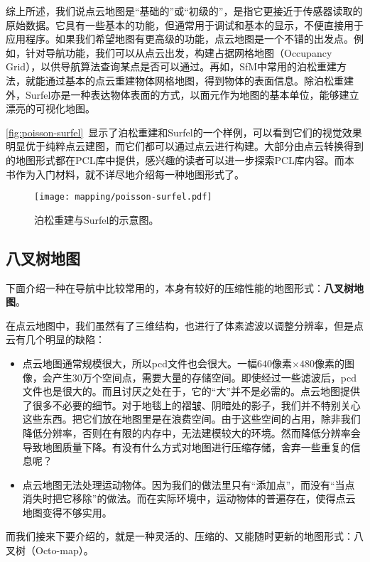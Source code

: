 综上所述，我们说点云地图是“基础的”或“初级的”，是指它更接近于传感器读取的原始数据。它具有一些基本的功能，但通常用于调试和基本的显示，不便直接用于应用程序。如果我们希望地图有更高级的功能，点云地图是一个不错的出发点。例如，针对导航功能，我们可以从点云出发，构建占据网格地图（Occupancy Grid），以供导航算法查询某点是否可以通过。再如，SfM中常用的泊松重建\textsuperscript{\cite{Kazhdan2006}}方法，就能通过基本的点云重建物体网格地图，得到物体的表面信息。除泊松重建外，Surfel亦是一种表达物体表面的方式，以面元作为地图的基本单位，能够建立漂亮的可视化地图\textsuperscript{\cite{Stuckler2014}}。

\autoref{fig:poisson-surfel}~显示了泊松重建和Surfel的一个样例，可以看到它们的视觉效果明显优于纯粹点云建图，而它们都可以通过点云进行构建。大部分由点云转换得到的地图形式都在PCL库中提供，感兴趣的读者可以进一步探索PCL库内容。而本书作为入门材料，就不详尽地介绍每一种地图形式了。

\begin{figure}[!htp]
	\centering
	\texttt{[image: mapping/poisson-surfel.pdf]}
	\caption{泊松重建与Surfel的示意图。}
	\label{fig:poisson-surfel}
\end{figure}

\subsection{八叉树地图}
下面介绍一种在导航中比较常用的，本身有较好的压缩性能的地图形式：\textbf{八叉树地图}。

在点云地图中，我们虽然有了三维结构，也进行了体素滤波以调整分辨率，但是点云有几个明显的缺陷：

\begin{itemize}
	\item 点云地图通常规模很大，所以pcd文件也会很大。一幅$640$像素$\times480$像素的图像，会产生30万个空间点，需要大量的存储空间。即使经过一些滤波后，pcd文件也是很大的。而且讨厌之处在于，它的“大”并不是必需的。点云地图提供了很多不必要的细节。对于地毯上的褶皱、阴暗处的影子，我们并不特别关心这些东西。把它们放在地图里是在浪费空间。由于这些空间的占用，除非我们降低分辨率，否则在有限的内存中，无法建模较大的环境。然而降低分辨率会导致地图质量下降。有没有什么方式对地图进行压缩存储，舍弃一些重复的信息呢？
	\item 点云地图无法处理运动物体。因为我们的做法里只有“添加点”，而没有“当点消失时把它移除”的做法。而在实际环境中，运动物体的普遍存在，使得点云地图变得不够实用。
\end{itemize}

而我们接来下要介绍的，就是一种灵活的、压缩的、又能随时更新的地图形式：八叉树（Octo-map）\textsuperscript{\cite{Hornung2013}}。

